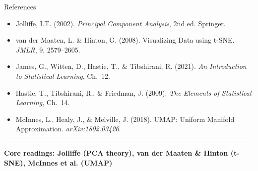 \documentclass[8pt,aspectratio=169]{beamer}
\newcommand{\bottomnote}[1]{%
\vfill
\vspace{-2mm}
\textcolor{mllavender2}{\rule{\textwidth}{0.4pt}}
\vspace{1mm}
\footnotesize
\textbf{#1}
}
\begin{document}
\begin{frame}[t]{References}
\footnotesize
\begin{itemize}
  \item Jolliffe, I.T. (2002). \textit{Principal Component Analysis}, 2nd ed. Springer.
  \item van der Maaten, L. \& Hinton, G. (2008). Visualizing Data using t-SNE. \textit{JMLR}, 9, 2579--2605.
  \item James, G., Witten, D., Hastie, T., \& Tibshirani, R. (2021). \textit{An Introduction to Statistical Learning}, Ch.~12.
  \item Hastie, T., Tibshirani, R., \& Friedman, J. (2009). \textit{The Elements of Statistical Learning}, Ch.~14.
  \item McInnes, L., Healy, J., \& Melville, J. (2018). UMAP: Uniform Manifold Approximation. \textit{arXiv:1802.03426}.
\end{itemize}
\bottomnote{Core readings: Jolliffe (PCA theory), van der Maaten \& Hinton (t-SNE), McInnes et al. (UMAP)}
\end{frame}
\end{document}

